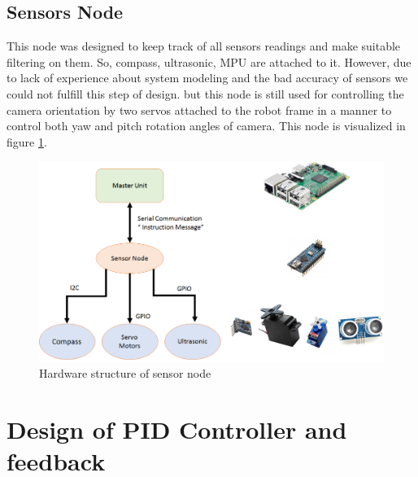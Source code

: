 \documentclass[12pt]{book}
\begin{document}
\section{Sensors Node}
	This node was designed to keep track of all sensors readings and make suitable filtering on them. So, compass, ultrasonic, MPU are attached to it. However, due to lack of experience about system modeling and the bad accuracy of sensors we could not fulfill this step of design. but this node is still used for controlling the camera orientation by two servos attached to the robot frame in a manner to control both yaw and pitch rotation angles of camera.
	This node is visualized in figure \ref{fig:sensor-node}.
	\begin{figure}
		\centering
		\includegraphics[width =1\textwidth]{Fig/sensor-node.png}
		\caption{Hardware structure of sensor node}
		\label{fig:sensor-node}
	\end{figure}






\chapter{Design of PID Controller and feedback}
\end{document}
